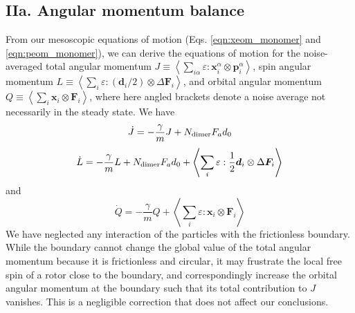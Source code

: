 \documentclass[%
 reprint,
superscriptaddress,
longbibliography,
 amsmath,amssymb,
 prl,
 citeautoscript,
]{revtex4-1}
\begin{document}
\subsection{IIa. Angular momentum balance}

From our mesoscopic equations of motion (Eqs. \ref{eqn:xeom_monomer} and \ref{eqn:peom_monomer}), we can derive the equations of motion for the noise-averaged total angular momentum $J \equiv \left\langle \sum_{i \alpha} \varepsilon : {\boldsymbol x}_i^{\alpha} \otimes {\boldsymbol p}_i^{\alpha} \right\rangle$, spin angular momentum $L \equiv \left\langle \sum_i \varepsilon : \left( {\boldsymbol d}_i / 2 \right) \otimes \Delta {\boldsymbol F}_i \right\rangle$, and orbital angular momentum $Q \equiv \left\langle \sum_i {\boldsymbol x}_i \otimes {\boldsymbol F}_i \right\rangle$, where here angled brackets denote a noise average not necessarily in the steady state. We have
\begin{equation}
\dot{J} = - \frac{\gamma}{m} J + N_{\rm dimer} F_a d_0
\label{eqn:J_balance}
\end{equation}
\begin{equation}
\dot{L} = - \frac{\gamma}{m} L + N_{\rm dimer} F_a d_0 + \left\langle \sum_i \varepsilon : \frac{1}{2} {\boldsymbol d}_i \otimes \Delta {\boldsymbol F}_i \right\rangle
\label{eqn:L_balance}
\end{equation}
and
\begin{equation}
\dot{Q} = - \frac{\gamma}{m} Q + \left\langle \sum_i \varepsilon : {\boldsymbol x}_i \otimes {\boldsymbol F}_i \right\rangle
\label{eqn:Q_balance}
\end{equation}
We have neglected any interaction of the particles with the frictionless boundary. While the boundary cannot change the global value of the total angular momentum because it is frictionless and circular, it may frustrate the local free spin of a rotor close to the boundary, and correspondingly increase the orbital angular momentum at the boundary such that its total contribution to $J$ vanishes. This is a negligible correction that does not affect our conclusions.
\end{document}
